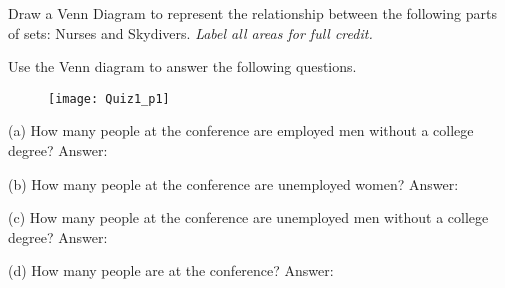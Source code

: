 \documentclass[10.5pt]{article}
\begin{document}
\newpage
\begin{problem}{5} 
Draw a Venn Diagram to represent the relationship between the following parts of sets: 
Nurses and Skydivers. \emph{Label all areas for full credit.}
\vspace{2.5in}
\end{problem}

\begin{problem}{4} Use the Venn diagram to answer the following questions. 
\begin{figure}[!ht]
  \centering
    \texttt{[image: Quiz1\_p1]}
\end{figure}
\begin{description}
\item{(a)} How many people at the conference are employed men without a college degree? 
Answer: \underline{\hspace{0.5in}} \\
\item{(b)} How many people at the conference are unemployed women? 
Answer: \underline{\hspace{0.5in}} \\
\item{(c)} How many people at the conference are unemployed men without a college degree? 
Answer: \underline{\hspace{0.5in}} \\
\item{(d)} How many people are at the conference? 
Answer: \underline{\hspace{0.5in}} \\
\end{description}
\vspace{3.9in}
\end{problem}


\showpoints
\end{document}
